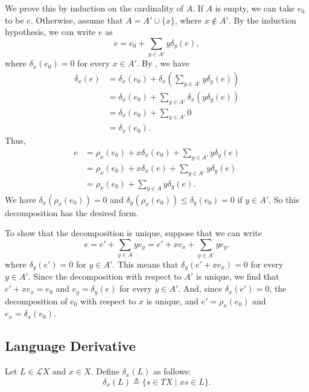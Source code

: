 \documentclass[a4paper,UKenglish,cleveref, autoref, thm-restate]{lipics-v2021}
\begin{document}
\begin{proofEnd}
  We prove this by induction on the cardinality of $A$.  If $A$ is empty, we can
  take $e_0$ to be $e$. Otherwise, assume that $A = A'  \cup  \{x\}$, where $x  \notin  A'$.
  By the induction hypothesis, we can write $e$ as
  \[ e = e_0 +  \sum _{y  \in  A'} y \delta _y(e), \] where $ \delta _x(e_0) = 0$ for every $x  \in 
  A'$. By , we have
  \begin{align*}
     \delta _x(e)
    & =  \delta _x(e_0) +  \delta _x\left( \sum _{y  \in  A'}y \delta _y(e)\right) \\
    & =  \delta _x(e_0) +  \sum _{y  \in  A'} \delta _x(y \delta _y(e)) \\
    & =  \delta _x(e_0) +  \sum _{y  \in  A'}0 \\
    & =  \delta _x(e_0).
  \end{align*}
  Thus,
  \begin{align*}
    e
    & =  \rho _x(e_0) + x \delta _x(e_0) +  \sum _{y  \in  A'}y \delta _y(e) \\
    & =  \rho _x(e_0) + x \delta _x(e) +  \sum _{y  \in  A'}y \delta _y(e) \\
    & =  \rho _x(e_0) +  \sum _{y  \in  A}y \delta _y(e).
  \end{align*}
  We have $ \delta _x( \rho _x(e_0)) = 0$ and $ \delta _y( \rho _x(e_0))  \leq   \delta _y(e_0) = 0$ if $y  \in  A'$.
  So this decomposition has the desired form.

  To show that the decomposition is unique, suppose that we can write
  \[ e = e' +  \sum _{y  \in  A} y e_y = e' + xe_x +  \sum _{y  \in  A'} ye_y. \] where
  $ \delta _y(e') = 0$ for $y  \in  A'$.  This means that $ \delta _y(e' + xe_x) = 0$ for every
  $y  \in  A'$.  Since the decomposition with respect to $A'$ is unique, we find
  that $e' + xe_x = e_0$ and $e_y =  \delta _y(e)$ for every $y  \in  A'$.  And, since
  $ \delta _x(e') = 0$, the decomposition of $e_0$ with respect to $x$ is unique, and
  $e' =  \rho _x(e_0)$ and $e_x =  \delta _x(e_0)$.
\end{proofEnd}

\subsection{Language Derivative}

\begin{definition}
  \label{def:language-derivative}
  Let $L  \in  \mathcal{L}X$ and $x  \in  X$.  Define $ \delta _x(L)$ as follows:
  \[  \delta _x(L)  \triangleq  \{ s  \in  TX  \mid  xs  \in  L \}. \]
\end{definition}
\end{document}
